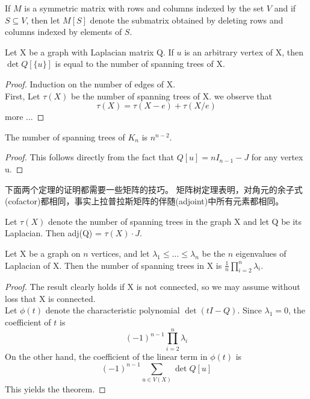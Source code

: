 \documentclass[11pt,fleqn]{book} %
\begin{document}
\begin{CJK}{UTF8}{gkai}
\begin{definition}
    If $M$ is a symmetric matrix with rows and columns indexed by the set $V$ and if $S \subseteq V$, then let $M[S]$ denote the submatrix obtained by deleting rows and columns indexed by elements of $S$.  
\end{definition}

\begin{theorem}
     Let X be a graph with Laplacian matrix Q. If $u$ is an arbitrary vertex of X, then $\det Q[\{u\}]$ is equal to the number of spanning trees of X.
\end{theorem}
\begin{proof}
    Induction on the number of edges of X. \\
    First, Let $\tau(X)$ be the number of spanning trees of X. we observe that 
    \[
        \tau (X) = \tau (X - e) + \tau (X/e)\]
    more ...
\end{proof}

\begin{corollary}
    The number of spanning trees of $K_n$ is $n^{n-2}$.
\end{corollary}
\begin{proof}
    This follows directly from the fact that $Q[u] = nI_{n-1} - J$ for any vertex u.    
\end{proof}

下面两个定理的证明都需要一些矩阵的技巧。
矩阵树定理表明，对角元的余子式(cofactor)都相同，事实上拉普拉斯矩阵的伴随(adjoint)中所有元素都相同。
\begin{theorem}
    Let $\tau (X)$ denote the number of spanning trees in the graph X and let Q be its Laplacian. Then adj(Q) = $\tau (X) \cdot J$.
\end{theorem}

\begin{theorem}
    Let X be a graph on $n$ vertices, and let $\lambda_1\leq...\leq\lambda_n$ be the $n$ eigenvalues of Laplacian of X. Then the number of spanning trees in X is
     $\frac 1 n {\prod_{i = 2}^{n}\lambda_i}$.
\end{theorem}
\begin{proof}
    The result clearly holds if X is not connected, so we may assume without loss that X is connected. \\
    Let $\phi(t)$ denote the characteristic polynomial $\det (tI - Q)$. Since $\lambda_1 = 0$, the coefficient of $t$ is 
    \[
        (-1)^{n-1}\prod_{i=2}^{n}\lambda_i\]
    On the other hand, the coefficient of the linear term in $\phi(t)$ is 
    \[
        (-1)^{n-1}\sum_{u \in V(X)} \det Q[u]\]
    This yields the theorem.    
\end{proof}


\end{CJK}
\end{document}
